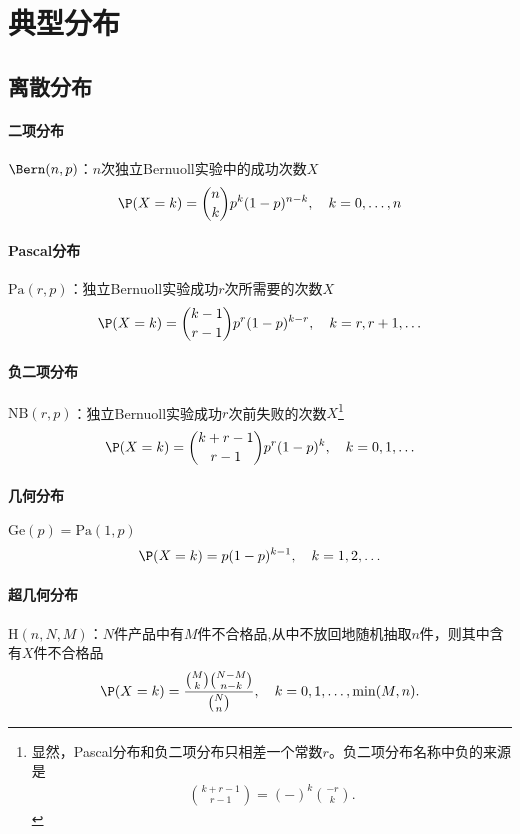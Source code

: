 \section{典型分布}

\subsection{离散分布}

\paragraph{二项分布}$\Bern(n,p)$：$n$次独立Bernuoll实验中的成功次数$X$
\begin{align}
	\P(X=k)={n\choose k}p^k(1-p)^{n-k},\quad k=0,\ldots,n
\end{align}
\paragraph{Pascal分布}$\mathrm{Pa}(r,p)$：独立Bernuoll实验成功$r$次所需要的次数$X$
\begin{align}
	\P(X=k)={k-1\choose r-1}p^r(1-p)^{k-r},\quad k=r,r+1,\ldots
\end{align}
\paragraph{负二项分布}$\mathrm{NB}(r,p)$：独立Bernuoll实验成功$r$次前失败的次数$X$\footnote{显然，Pascal分布和负二项分布只相差一个常数$r$。负二项分布名称中负的来源是\begin{align}
	{k+r-1\choose r-1}=(-)^k{-r\choose k}.
\end{align}}
\begin{align}
	\P(X=k)={k+r-1\choose r-1}p^r(1-p)^k,\quad k=0,1,\ldots
\end{align}
\paragraph{几何分布}$\mathrm{Ge}(p)=\mathrm{Pa}(1,p)$
\begin{align}
	\P(X=k)=p(1-p)^{k-1},\quad k=1,2,\ldots
\end{align}
\paragraph{超几何分布}$\mathrm H(n,N,M)$：$N$件产品中有$M$件不合格品,从中不放回地随机抽取$n$件，则其中含有$X$件不合格品
\begin{align}
	\P(X=k)=\frac{{M\choose k}{N-M\choose n-k}}{{N\choose n}},\quad k=0,1,\ldots,\min(M,n).
\end{align}

